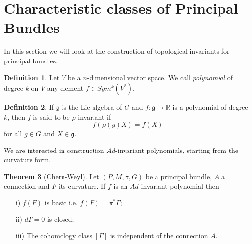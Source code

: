 \documentclass[12pt,a4paper]{report}
\theoremstyle{definition}
\newtheorem{Def}{Definition}[chapter]
\theoremstyle{Theorem}
\newtheorem{Theo}[Def]{Theorem}
\theoremstyle{definition}
\theoremstyle{definition}
\begin{document}
		\section{Characteristic classes of Principal Bundles}
		In this section we will look at the construction of topological invariants for principal bundles.
		\begin{Def}
			Let $V$ be a $n$-dimensional vector space. We call \textit{polynomial} of degree $k$ on $V$ any element $f\in Sym^k(V^*)$.
		\end{Def}
		\begin{Def}
			If $\mathfrak{g}$ is the Lie algebra of $G$ and $f:\mathfrak{g}\rightarrow \mathbb{R}$ is a polynomial of degree $k$, then $f$ is said to be $\rho$-invariant if
			$$f(\rho(g)X)=f(X)$$
			for all $g\in G$ and $X\in \mathfrak{g}$.
		\end{Def}
		We are interested in construction $Ad$-invariant polynomials, starting from the curvature form.
		\begin{Theo}[Chern-Weyl]
			Let $(P,M,\pi,G)$ be a principal bundle, $A$ a connection and $F$ its curvature. If $f$ is an $Ad$-invariant polynomial then:
			\begin{itemize}
				\item[i)] $f(F)$ is basic i.e. $f(F)=\pi^*\Gamma$;
				\item[ii)] $d\Gamma=0$ is closed;
				\item[iii)] The cohomology class $[\Gamma]$ is independent of the connection $A$.
			\end{itemize}
		\end{Theo}
\end{document}
